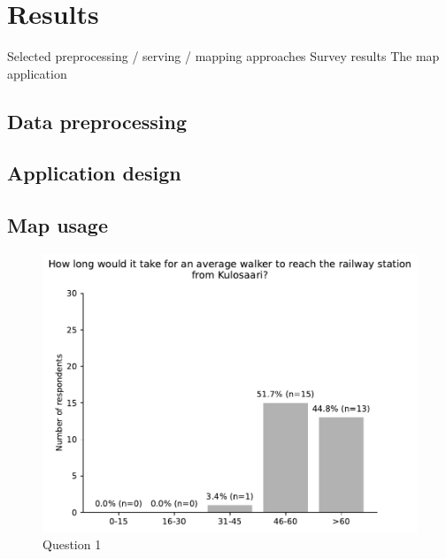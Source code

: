 \section{Results}
Selected preprocessing / serving / mapping approaches
Survey results
The map application

\subsection{Data preprocessing}

\subsection{Application design}

\subsection{Map usage}

\begin{figure}[H]
	\centering
	\includegraphics[width=1\textwidth]{images/questionnaire/0.pdf}
	\caption{Question 1}
	\label{fig:architechture}
\end{figure}

